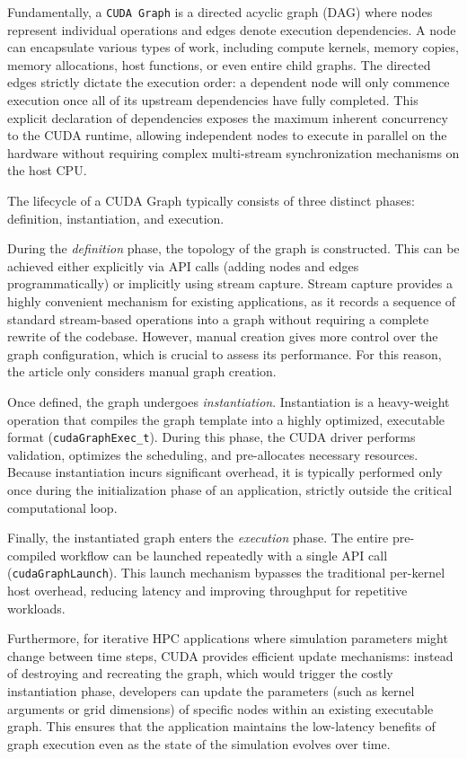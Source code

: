 \documentclass[10pt,twocolumn]{article}
\begin{document}
Fundamentally, a \texttt{CUDA Graph} is a directed acyclic graph (DAG) where nodes represent individual operations and edges denote execution dependencies. 
A node can encapsulate various types of work, including compute kernels, memory copies, memory allocations, host functions, or even entire child graphs. 
The directed edges strictly dictate the execution order: a dependent node will only commence execution once all of its upstream dependencies have fully completed. 
This explicit declaration of dependencies exposes the maximum inherent concurrency to the CUDA runtime, allowing independent nodes to execute in parallel on the hardware without requiring complex multi-stream synchronization mechanisms on the host CPU.

The lifecycle of a CUDA Graph typically consists of three distinct phases: definition, instantiation, and execution. 

During the \emph{definition} phase, the topology of the graph is constructed. 
This can be achieved either explicitly via API calls (adding nodes and edges programmatically) or implicitly using stream capture. 
Stream capture provides a highly convenient mechanism for existing applications, as it records a sequence of standard stream-based operations into a graph without requiring a complete rewrite of the codebase.
However, manual creation gives more control over the graph configuration, which is crucial to assess its performance.
For this reason, the article only considers manual graph creation.

Once defined, the graph undergoes \emph{instantiation}. Instantiation is a heavy-weight operation that compiles the graph template into a highly optimized, executable format (\texttt{cudaGraphExec\_t}). During this phase, the CUDA driver performs validation, optimizes the scheduling, and pre-allocates necessary resources. Because instantiation incurs significant overhead, it is typically performed only once during the initialization phase of an application, strictly outside the critical computational loop.

Finally, the instantiated graph enters the \emph{execution} phase. The entire pre-compiled workflow can be launched repeatedly with a single API call (\texttt{cudaGraphLaunch}). This launch mechanism bypasses the traditional per-kernel host overhead, reducing latency and improving throughput for repetitive workloads.

Furthermore, for iterative HPC applications where simulation parameters might change between time steps, CUDA provides efficient update mechanisms: instead of destroying and recreating the graph, which would trigger the costly instantiation phase, developers can update the parameters (such as kernel arguments or grid dimensions) of specific nodes within an existing executable graph. 
This ensures that the application maintains the low-latency benefits of graph execution even as the state of the simulation evolves over time.
\end{document}
